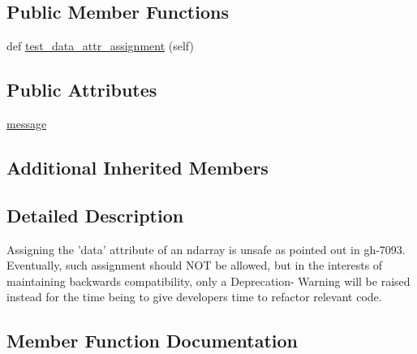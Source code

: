 \subsection*{Public Member Functions}
\begin{DoxyCompactItemize}
\item 
def \hyperlink{classnumpy_1_1core_1_1tests_1_1test__deprecations_1_1TestArrayDataAttributeAssignmentDeprecation_a7e2638d4a32f4d4fa3a16686a640285d}{test\+\_\+data\+\_\+attr\+\_\+assignment} (self)
\end{DoxyCompactItemize}
\subsection*{Public Attributes}
\begin{DoxyCompactItemize}
\item 
\hyperlink{classnumpy_1_1core_1_1tests_1_1test__deprecations_1_1TestArrayDataAttributeAssignmentDeprecation_aaee90c08bf312a0403e74be0d66602f4}{message}
\end{DoxyCompactItemize}
\subsection*{Additional Inherited Members}


\subsection{Detailed Description}
\begin{DoxyVerb}Assigning the 'data' attribute of an ndarray is unsafe as pointed
 out in gh-7093. Eventually, such assignment should NOT be allowed, but
 in the interests of maintaining backwards compatibility, only a Deprecation-
 Warning will be raised instead for the time being to give developers time to
 refactor relevant code.
\end{DoxyVerb}
 

\subsection{Member Function Documentation}
\mbox{\label{classnumpy_1_1core_1_1tests_1_1test__deprecations_1_1TestArrayDataAttributeAssignmentDeprecation_a7e2638d4a32f4d4fa3a16686a640285d}} 
